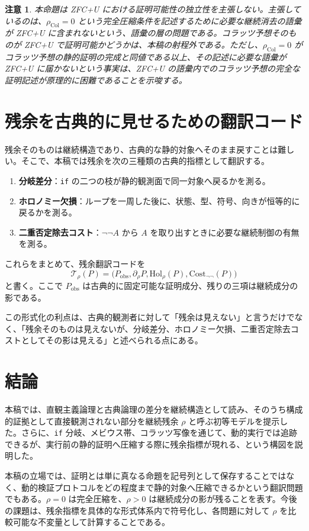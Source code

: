 \documentclass[11pt,a4paper,ja=standard,autodetect-engine]{bxjsarticle}
\newtheorem{remark}{注意}
\begin{document}
\begin{remark}
本命題は ZFC+U における証明可能性の独立性を主張しない。主張しているのは、$\rho_{\mathrm{Col}}=0$ という完全圧縮条件を記述するために必要な継続消去の語彙が ZFC+U に含まれないという、語彙の層の問題である。コラッツ予想そのものが ZFC+U で証明可能かどうかは、本稿の射程外である。ただし、$\rho_{\mathrm{Col}}=0$ がコラッツ予想の静的証明の完成と同値である以上、その記述に必要な語彙が ZFC+U に届かないという事実は、ZFC+U の語彙内でのコラッツ予想の完全な証明記述が原理的に困難であることを示唆する。
\end{remark}

\section{残余を古典的に見せるための翻訳コード}

残余そのものは継続構造であり、古典的な静的対象へそのまま戻すことは難しい。そこで、本稿では残余を次の三種類の古典的指標として翻訳する。

\begin{enumerate}
    \item \textbf{分岐差分}：\texttt{if} の二つの枝が静的観測面で同一対象へ戻るかを測る。
    \item \textbf{ホロノミー欠損}：ループを一周した後に、状態、型、符号、向きが恒等的に戻るかを測る。
    \item \textbf{二重否定除去コスト}：$\neg\neg A$ から $A$ を取り出すときに必要な継続制御の有無を測る。
\end{enumerate}

これらをまとめて、残余翻訳コードを
\begin{equation}
    \mathcal{T}_{\rho}(P)=
    \bigl(P_{\mathrm{obs}},
    \partial_{\rho}P,
    \mathrm{Hol}_{\rho}(P),
    \mathrm{Cost}_{\neg\neg}(P)\bigr)
\end{equation}
と書く。ここで $P_{\mathrm{obs}}$ は古典的に固定可能な証明成分、残りの三項は継続成分の影である。

この形式化の利点は、古典的観測者に対して「残余は見えない」と言うだけでなく、「残余そのものは見えないが、分岐差分、ホロノミー欠損、二重否定除去コストとしてその影は見える」と述べられる点にある。

\section{結論}

本稿では、直観主義論理と古典論理の差分を継続構造として読み、そのうち構成的証拠として直接観測されない部分を継続残余 $\rho$ と呼ぶ初等モデルを提示した。さらに、\texttt{if} 分岐、メビウス帯、コラッツ写像を通じて、動的実行では追跡できるが、実行前の静的証明へ圧縮する際に残余指標が現れる、という構図を説明した。

本稿の立場では、証明とは単に真なる命題を記号列として保存することではなく、動的検証プロトコルをどの程度まで静的対象へ圧縮できるかという翻訳問題でもある。$\rho=0$ は完全圧縮を、$\rho>0$ は継続成分の影が残ることを表す。今後の課題は、残余指標を具体的な形式体系内で符号化し、各問題に対して $\rho$ を比較可能な不変量として計算することである。
\end{document}

